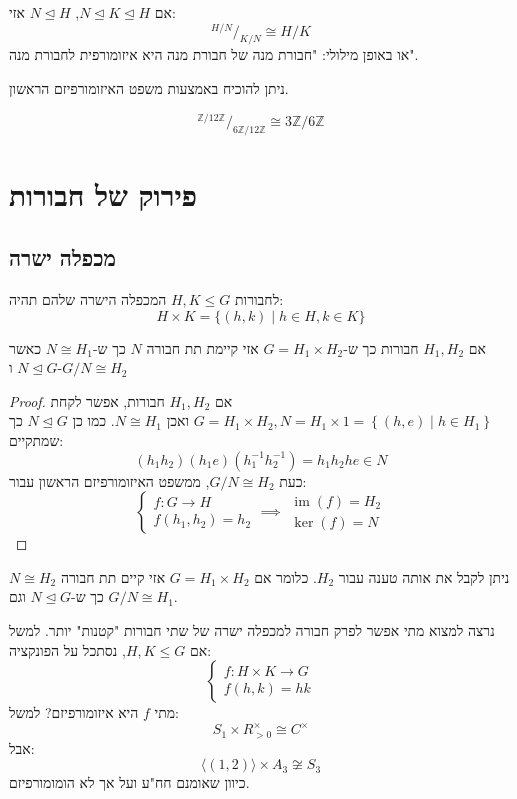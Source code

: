 \documentclass{tstextbook}
\begin{document}
\begin{theorem}
אם \(N\trianglelefteq K\trianglelefteq H\), \(N\trianglelefteq H\) אזי:
$$^{H / N }/ _{ K  / N } \cong H/K$$
או באופן מילולי: "חבורת מנה של חבורת מנה היא איזומורפית לחבורת מנה".

\end{theorem}
ניתן להוכיח באמצעות משפט האיזומורפיזם הראשון.

\begin{example}
$$^{\mathbb{Z} / 12 \mathbb{Z} }
/ _{ 6\mathbb{Z}  / 12 \mathbb{Z} } \cong 3 \mathbb{Z}  / 6\mathbb{Z}$$

\end{example}
\chapter{פירוק של חבורות}

\section{מכפלה ישרה}

\begin{definition}
לחבורות \(H,K\leq G\) המכפלה הישרה שלהם תהיה:
$$ H\times K=\{(h,k)\mid h\in H,k\in K\}$$

\end{definition}
\begin{proposition}
אם \(H_{1}, H_{2}\) חבורות כך ש-\(G=H_{1}\times H_{2}\) אזי קיימת תת חבורה \(N\) כך ש-\(N\cong H_{1}\) כאשר \(N\trianglelefteq G\) ו-\(G / N \cong H_{2}\)

\end{proposition}
\begin{proof}
אם \(H_{1}, H_{2}\) חבורות, אפשר לקחת \(G=H_{1}\times H_{2}, N=H_{1}\times 1=\left\{  (h,e)\mid h\in H_{1}  \right\}\) ואכן \(N\cong H_{1}\). כמו כן \(N\trianglelefteq G\) כך שמתקיים:
$$(h_{1}h_{2})(h_{1}e)(h_{1}^{-1} h_{2}^{-1} )=h_{1}h_{2}he\in N$$
כעת \(G / N \cong H_{2}\), ממשפט האיזומורפיזם הראשון עבור: 
$$\begin{cases}f:G\to H \\f(h_{1},h_{2})=h_{2}\end{cases}\implies \begin{array}{c }\operatorname{im}(f)=H_{2} \\\ker(f)=N 
\end{array}$$

\end{proof}
\begin{corollary}
ניתן לקבל את אותה טענה עבור \(H_{2}\). כלומר אם \(G=H_{1}\times H_{2}\) אזי קיים תת חבורה \(N\cong H_{2}\) כך ש-\(N\trianglelefteq G\) וגם \(G / N \cong H_{1}\).

\end{corollary}
נרצה למצוא מתי אפשר לפרק חבורה למכפלה ישרה של שתי חבורות "קטנות" יותר. למשל אם \(H,K\leq G\), נסתכל על הפונקציה: 
$$\begin{cases}f:H\times K\to G \\f(h,k)=hk
\end{cases}$$
מתי \(f\) היא איזומורפיזם? למשל:
$$S_{1}\times R^{\times}_{>0}\cong C^{\times}$$
אבל:
$$\langle (1,2) \rangle \times A_{3}\not\cong  S_{3}$$
כיוון שאומנם חח"ע ועל אך לא הומומורפיזם.
\end{document}

